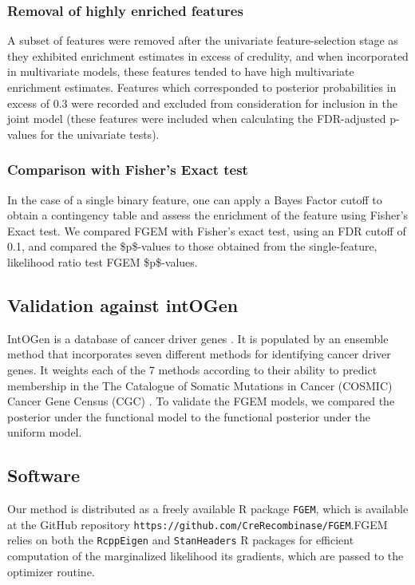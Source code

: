 \subsubsection{Removal of highly enriched features}\label{sec:org02cff25}

    A subset of features were removed after the univariate feature-selection stage as they exhibited enrichment estimates in excess of credulity, and when incorporated in multivariate models, these features tended to have high multivariate enrichment estimates. Features which corresponded to posterior probabilities in excess of 0.3 were recorded and excluded from consideration for inclusion in the joint model (these features were included when calculating the FDR-adjusted p-values for the univariate tests).  

\subsubsection{Comparison with Fisher's Exact test}\label{sec:orge6f1632}

In the case of a single binary feature, one can apply a Bayes Factor cutoff to obtain a contingency table and assess the enrichment of the feature using Fisher's Exact test.
We compared FGEM with Fisher's exact test, using an FDR cutoff of 0.1, and compared the \$p\$-values to those obtained from the single-feature, likelihood ratio test FGEM \$p\$-values.

\subsection{Validation against intOGen}\label{sec:orgd8b4e10}

IntOGen is a database of cancer driver genes \cite{gonzalez-perez13_intog_mutat_ident_cancer_driver}.  It is populated by an ensemble method that incorporates seven different methods for identifying cancer driver genes.  
It weights each of the 7 methods according to their ability to predict membership in the The Catalogue of Somatic Mutations in Cancer (COSMIC) Cancer Gene Census (CGC) \cite{COSMIC}.
To validate the FGEM models, we compared the posterior under the functional model to the functional posterior under the uniform model.


\subsection{Software}\label{sec:org56b3320}

Our method is distributed as a freely available R package \cite{Rlang} \texttt{FGEM}, which is available at the GitHub repository \texttt{https://github.com/CreRecombinase/FGEM}.FGEM relies on both the \texttt{RcppEigen} \cite{RcppEigen} and  \texttt{StanHeaders} R packages for efficient computation of the marginalized likelihood its gradients, which are passed to the optimizer routine.  



